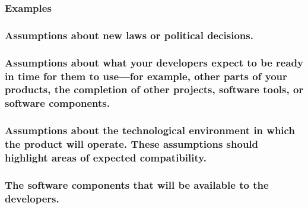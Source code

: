 \documentclass[
]{article}
\begin{document}
\hypertarget{examples-11}{%
\subsubsection{Examples}\label{examples-11}}

\hypertarget{assumptions-about-new-laws-or-political-decisions.}{%
\subsubsection{Assumptions about new laws or political
decisions.}\label{assumptions-about-new-laws-or-political-decisions.}}

\hypertarget{assumptions-about-what-your-developers-expect-to-be-ready-in-time-for-them-to-usefor-example-other-parts-of-your-products-the-completion-of-other-projects-software-tools-or-software-components.}{%
\subsubsection{Assumptions about what your developers expect to be ready
in time for them to use---for example, other parts of your products, the
completion of other projects, software tools, or software
components.}\label{assumptions-about-what-your-developers-expect-to-be-ready-in-time-for-them-to-usefor-example-other-parts-of-your-products-the-completion-of-other-projects-software-tools-or-software-components.}}

\hypertarget{assumptions-about-the-technological-environment-in-which-the-product-will-operate.-these-assumptions-should-highlight-areas-of-expected-compatibility.}{%
\subsubsection{\texorpdfstring{Assumptions about the technological
environment in which the product will operate. These assumptions should
highlight areas of expected compatibility.
}{Assumptions about the technological environment in which the product will operate. These assumptions should highlight areas of expected compatibility. }}\label{assumptions-about-the-technological-environment-in-which-the-product-will-operate.-these-assumptions-should-highlight-areas-of-expected-compatibility.}}

\hypertarget{the-software-components-that-will-be-available-to-the-developers.}{%
\subsubsection{The software components that will be available to the
developers.}\label{the-software-components-that-will-be-available-to-the-developers.}}
\end{document}
